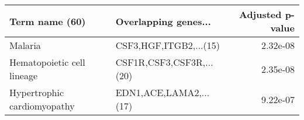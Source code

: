 \begin{tabular}{llr}
\toprule
             Term name (60) &     Overlapping genes... &  Adjusted p-value \\
\midrule
                    Malaria &   CSF3,HGF,ITGB2,...(15) &          2.32e-08 \\
 Hematopoietic cell lineage & CSF1R,CSF3,CSF3R,...(20) &          2.35e-08 \\
Hypertrophic cardiomyopathy &   EDN1,ACE,LAMA2,...(17) &          9.22e-07 \\
\bottomrule
\end{tabular}
